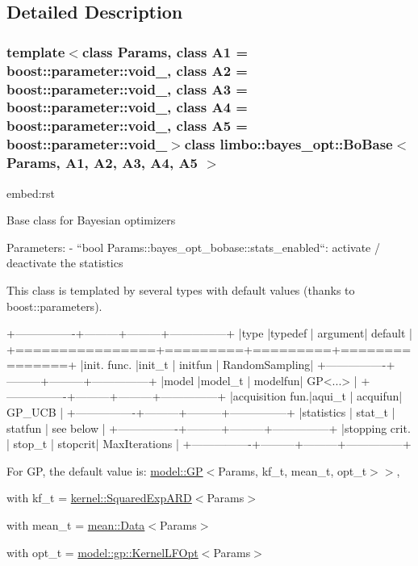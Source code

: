 \subsection{Detailed Description}
\subsubsection*{template$<$class Params, class A1 = boost\+::parameter\+::void\+\_\+, class A2 = boost\+::parameter\+::void\+\_\+, class A3 = boost\+::parameter\+::void\+\_\+, class A4 = boost\+::parameter\+::void\+\_\+, class A5 = boost\+::parameter\+::void\+\_\+$>$class limbo\+::bayes\+\_\+opt\+::\+Bo\+Base$<$ Params, A1, A2, A3, A4, A5 $>$}

\begin{DoxyVerb}embed:rst

Base class for Bayesian optimizers

Parameters:
  - ``bool Params::bayes_opt_bobase::stats_enabled``: activate / deactivate the statistics

This class is templated by several types with default values (thanks to boost::parameters).

+----------------+---------+---------+---------------+
|type            |typedef  | argument| default       |
+================+=========+=========+===============+
|init. func.     |init_t   | initfun | RandomSampling|
+----------------+---------+---------+---------------+
|model           |model_t  | modelfun| GP<...>       |
+----------------+---------+---------+---------------+
|acquisition fun.|aqui_t   | acquifun| GP_UCB        |
+----------------+---------+---------+---------------+
|statistics      | stat_t  | statfun | see below     |
+----------------+---------+---------+---------------+
|stopping crit.  | stop_t  | stopcrit| MaxIterations |
+----------------+---------+---------+---------------+\end{DoxyVerb}


For G\+P, the default value is\+: {\ttfamily \hyperlink{classlimbo_1_1model_1_1_g_p}{model\+::\+G\+P}$<$Params, kf\+\_\+t, mean\+\_\+t, opt\+\_\+t$>$$>$},
\begin{DoxyItemize}
\item with {\ttfamily kf\+\_\+t = \hyperlink{structlimbo_1_1kernel_1_1_squared_exp_a_r_d}{kernel\+::\+Squared\+Exp\+A\+R\+D}$<$Params$>$}
\item with {\ttfamily mean\+\_\+t = \hyperlink{structlimbo_1_1mean_1_1_data}{mean\+::\+Data}$<$Params$>$}
\item with {\ttfamily opt\+\_\+t = \hyperlink{structlimbo_1_1model_1_1gp_1_1_kernel_l_f_opt}{model\+::gp\+::\+Kernel\+L\+F\+Opt}$<$Params$>$}
\end{DoxyItemize}

